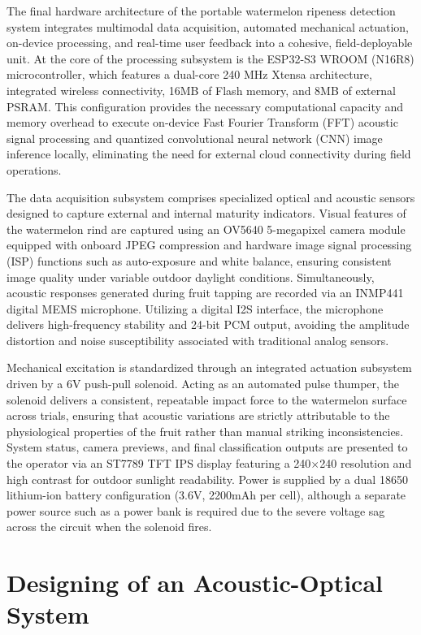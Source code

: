 \begin{thesisprose}
The final hardware architecture of the portable watermelon ripeness detection system integrates multimodal data acquisition, automated mechanical actuation, on-device processing, and real-time user feedback into a cohesive, field-deployable unit. At the core of the processing subsystem is the ESP32-S3 WROOM (N16R8) microcontroller, which features a dual-core 240 MHz Xtensa architecture, integrated wireless connectivity, 16MB of Flash memory, and 8MB of external PSRAM. This configuration provides the necessary computational capacity and memory overhead to execute on-device Fast Fourier Transform (FFT) acoustic signal processing and quantized convolutional neural network (CNN) image inference locally, eliminating the need for external cloud connectivity during field operations.

The data acquisition subsystem comprises specialized optical and acoustic sensors designed to capture external and internal maturity indicators. Visual features of the watermelon rind are captured using an OV5640 5-megapixel camera module equipped with onboard JPEG compression and hardware image signal processing (ISP) functions such as auto-exposure and white balance, ensuring consistent image quality under variable outdoor daylight conditions. Simultaneously, acoustic responses generated during fruit tapping are recorded via an INMP441 digital MEMS microphone. Utilizing a digital I2S interface, the microphone delivers high-frequency stability and 24-bit PCM output, avoiding the amplitude distortion and noise susceptibility associated with traditional analog sensors.

Mechanical excitation is standardized through an integrated actuation subsystem driven by a 6V push-pull solenoid. Acting as an automated pulse thumper, the solenoid delivers a consistent, repeatable impact force to the watermelon surface across trials, ensuring that acoustic variations are strictly attributable to the physiological properties of the fruit rather than manual striking inconsistencies. System status, camera previews, and final classification outputs are presented to the operator via an ST7789 TFT IPS display featuring a 240\ensuremath{\times}240 resolution and high contrast for outdoor sunlight readability. Power is supplied by a dual 18650 lithium-ion battery configuration (3.6V, 2200mAh per cell), although a separate power source such as a power bank is required due to the severe voltage sag across the circuit when the solenoid fires.

\section{Designing of an Acoustic-Optical System}


\end{thesisprose}
